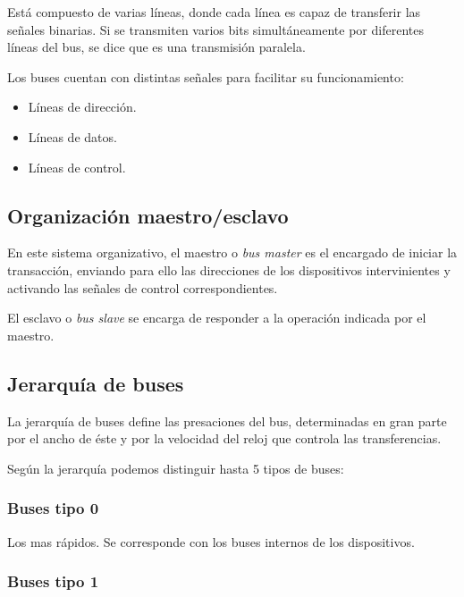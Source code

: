 \documentclass[a4paper, 11pt, titlepage]{article}
\begin{document}
    Está compuesto de varias líneas, donde cada línea es capaz de transferir las señales binarias. Si se transmiten 
    varios bits simultáneamente por diferentes líneas del bus, se dice que es una transmisión paralela.

    Los buses cuentan con distintas señales para facilitar su funcionamiento:

    \begin{itemize}
        \item Líneas de dirección.
        \item Líneas de datos.
        \item Líneas de control.
    \end{itemize}

    \subsection{Organización maestro/esclavo}

        En este sistema organizativo, el maestro o \textit{bus master} es el encargado de iniciar la transacción, 
        enviando para ello las direcciones de los dispositivos intervinientes y activando las señales de control 
        correspondientes.

        El esclavo o \textit{bus slave} se encarga de responder a la operación indicada por el maestro.

    \subsection{Jerarquía de buses}

        La jerarquía de buses define las presaciones del bus, determinadas en gran parte por el ancho de 
        éste y por la velocidad del reloj que controla las transferencias.

        Según la jerarquía podemos distinguir hasta 5 tipos de buses:

        \subsubsection{Buses tipo 0}

            Los mas rápidos. Se corresponde con los buses internos de los dispositivos.
        
        \subsubsection{Buses tipo 1}
\end{document}
